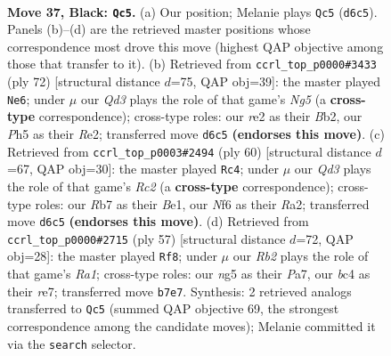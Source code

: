 \documentclass[11pt]{article}
\begin{document}
\clearpage

\begin{figure}[p]\centering
\begin{subfigure}{0.46\textwidth}\centering
\resizebox{\linewidth}{!}{%
\newchessgame
\chessboard[
  setfen={2b2k2/1r3p2/3q1np1/6Np/P1B5/6P1/1p1NRP1P/4R1K1 b - - 3 37},
  showmover=false,
  pgfstyle=straightmove, color=movearrow, markmove={d6-c5}
]}
\caption{}
\end{subfigure}\hfill
\begin{subfigure}{0.46\textwidth}\centering
\resizebox{\linewidth}{!}{%
\newchessgame
\chessboard[
  setfen={3r2k1/bp1r3p/p5p1/5pNn/2RP4/1P3KPP/PB2R3/8 w - - 3 37},
  showmover=false,
  pgfstyle=straightmove, color=movearrow, markmove={g5-e6}
]}
\caption{}
\end{subfigure}
\\[4pt]
\begin{subfigure}{0.46\textwidth}\centering
\resizebox{\linewidth}{!}{%
\newchessgame
\chessboard[
  setfen={1r2r1k1/p4p1p/6p1/P1b5/4nNP1/6P1/R1R4P/4BK2 w - - 0 31},
  showmover=false,
  pgfstyle=straightmove, color=movearrow, markmove={c2-c4}
]}
\caption{}
\end{subfigure}\hfill
\begin{subfigure}{0.46\textwidth}\centering
\resizebox{\linewidth}{!}{%
\newchessgame
\chessboard[
  setfen={r5k1/pp2R2p/1nq2Bp1/8/2p3P1/2N5/PP5P/5RK1 b - - 3 29},
  showmover=false,
  pgfstyle=straightmove, color=movearrow, markmove={a8-f8}
]}
\caption{}
\end{subfigure}
\caption{\textbf{Move 37, Black: \texttt{Qc5}.} (a) Our position; Melanie plays \texttt{Qc5} (\texttt{d6c5}). Panels (b)--(d) are the retrieved master positions whose correspondence most drove this move (highest QAP objective among those that transfer to it). (b) Retrieved from \texttt{ccrl\_top\_p0000\#3433} (ply 72) [structural distance $d$=75, QAP obj=39]: the master played \texttt{Ne6}; under $\mu$ our \emph{Qd3} plays the role of that game's \emph{Ng5} (a \textbf{cross-type} correspondence); cross-type roles: our \emph{r}e2 as their \emph{B}b2, our \emph{P}h5 as their \emph{R}e2; transferred move \texttt{d6c5} \textbf{(endorses this move)}. (c) Retrieved from \texttt{ccrl\_top\_p0003\#2494} (ply 60) [structural distance $d$=67, QAP obj=30]: the master played \texttt{Rc4}; under $\mu$ our \emph{Qd3} plays the role of that game's \emph{Rc2} (a \textbf{cross-type} correspondence); cross-type roles: our \emph{R}b7 as their \emph{B}e1, our \emph{N}f6 as their \emph{R}a2; transferred move \texttt{d6c5} \textbf{(endorses this move)}. (d) Retrieved from \texttt{ccrl\_top\_p0000\#2715} (ply 57) [structural distance $d$=72, QAP obj=28]: the master played \texttt{Rf8}; under $\mu$ our \emph{Rb2} plays the role of that game's \emph{Ra1}; cross-type roles: our \emph{n}g5 as their \emph{P}a7, our \emph{b}c4 as their \emph{r}e7; transferred move \texttt{b7e7}. Synthesis: 2 retrieved analogs transferred to \texttt{Qc5} (summed QAP objective 69, the strongest correspondence among the candidate moves); Melanie committed it via the \texttt{search} selector.}
\label{fig:thought-m73}
\end{figure}
\end{document}
